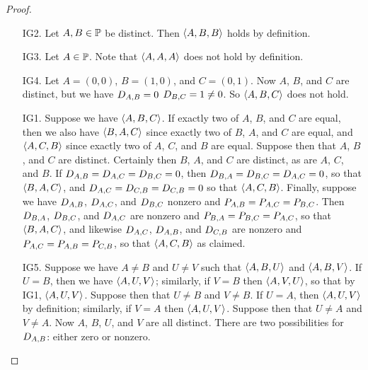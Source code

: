 \begin{proof}\mbox{}
\begin{itemize}
\item[IG2.] Let \(A,B \in \mathbb{P}\) be distinct.
Then \(\langle A, B, B \rangle\) holds by definition.

\item[IG3.] Let \(A \in \mathbb{P}\).
Note that \(\langle A, A, A \rangle\) does not hold by definition.

\item[IG4.] Let \(A = (0,0)\), \(B = (1,0)\), and \(C = (0,1)\).
Now \(A\), \(B\), and \(C\) are distinct, but we have \(D_{A,B} = 0\) \(D_{B,C} = 1 \neq 0\).
So \(\langle A, B, C \rangle\) does not hold.

\item[IG1.] Suppose we have \(\langle A, B, C \rangle\).
If exactly two of \(A\), \(B\), and \(C\) are equal, then we also have \(\langle B, A, C \rangle\) since exactly two of \(B\), \(A\), and \(C\) are equal, and \(\langle A, C, B \rangle\) since exactly two of \(A\), \(C\), and \(B\) are equal.
Suppose then that \(A\), \(B\), and \(C\) are distinct.
Certainly then \(B\), \(A\), and \(C\) are distinct, as are \(A\), \(C\), and \(B\).
If \(D_{A,B} = D_{A,C} = D_{B,C} = 0\), then \(D_{B,A} = D_{B,C} = D_{A,C} = 0\), so that \(\langle B, A, C \rangle\), and \(D_{A,C} = D_{C,B} = D_{C,B} = 0\) so that \(\langle A, C, B \rangle\).
Finally, suppose we have \(D_{A,B}\), \(D_{A,C}\), and \(D_{B,C}\) nonzero and \(P_{A,B} = P_{A,C} = P_{B,C}\).
Then \(D_{B,A}\), \(D_{B,C}\), and \(D_{A,C}\) are nonzero and \(P_{B,A} = P_{B,C} = P_{A,C}\), so that \(\langle B, A, C \rangle\), and likewise \(D_{A,C}\), \(D_{A,B}\), and \(D_{C,B}\) are nonzero and \(P_{A,C} = P_{A,B} = P_{C,B}\), so that \(\langle A, C, B \rangle\) as claimed.

\item[IG5.] Suppose we have \(A \neq B\) and \(U \neq V\) such that \(\langle A, B, U \rangle\) and \(\langle A, B, V \rangle\).
If \(U = B\), then we have \(\langle A, U, V \rangle\); similarly, if \(V = B\) then \(\langle A, V, U \rangle\), so that by IG1, \(\langle A, U, V \rangle\).
Suppose then that \(U \neq B\) and \(V \neq B\).
If \(U = A\), then \(\langle A, U, V \rangle\) by definition; similarly, if \(V = A\) then \(\langle A, U, V \rangle\).
Suppose then that \(U \neq A\) and \(V \neq A\).
Now \(A\), \(B\), \(U\), and \(V\) are all distinct.
There are two possibilities for \(D_{A,B}\): either zero or nonzero.


\end{itemize}
\end{proof}
